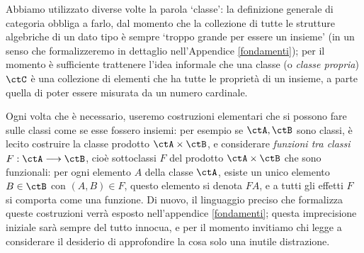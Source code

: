 \begin{remark}
Abbiamo utilizzato diverse volte la parola `classe': la definizione generale di categoria obbliga a farlo, dal momento che la collezione di tutte le strutture algebriche di un dato tipo è sempre `troppo grande per essere un insieme' (in un senso che formalizzeremo in dettaglio nell'Appendice \ref{fondamenti}); per il momento è sufficiente trattenere l'idea informale che una classe (o \emph{classe propria}) \(\ctC\) è una collezione di elementi che ha tutte le proprietà di un insieme, a parte quella di poter essere misurata da un numero cardinale.

Ogni volta che è necessario, useremo costruzioni elementari che si possono fare sulle classi come se esse fossero insiemi: per esempio se \(\ctA,\ctB\) sono classi, è lecito costruire la classe prodotto \(\ctA\times\ctB\), e considerare \emph{funzioni tra classi} \(F : \ctA\fun\ctB\), cioè sottoclassi \(F\) del prodotto \(\ctA\times\ctB\) che sono funzionali: per ogni elemento \(A\) della classe \(\ctA\), esiste un unico elemento \(B\in\ctB\) con \((A,B)\in F\), questo elemento si denota \(FA\), e a tutti gli effetti \(F\) si comporta come una funzione. Di nuovo, il linguaggio preciso che formalizza queste costruzioni verrà esposto nell'appendice \ref{fondamenti}; questa imprecisione iniziale sarà sempre del tutto innocua, e per il momento invitiamo chi legge a considerare il desiderio di approfondire la cosa solo una inutile distrazione.
\end{remark}
